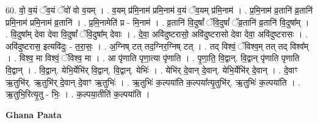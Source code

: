 \documentclass[17pt]{extarticle}
\begin{document}
60. वो॒ व॒यं ॅव॒यं ॅवो॑ वो व॒यम् । . व॒यम् प्र॑मि॒नाम॑ प्रमि॒नाम॑ व॒यं ॅव॒यम् प्र॑मि॒नाम॑ । . प्र॒मि॒नाम॑ व्र॒तानि॑ व्र॒तानि॑ प्रमि॒नाम॑ प्रमि॒नाम॑ व्र॒तानि॑ । . प्र॒मि॒नामेति॑ प्र - मि॒नाम॑ । . व्र॒तानि॑ वि॒दुषां᳚ ॅवि॒दुषां᳚ ॅव्र॒तानि॑ व्र॒तानि॑ वि॒दुषा᳚म् । . वि॒दुषा᳚म् देवा देवा वि॒दुषां᳚ ॅवि॒दुषा᳚म् देवाः । . दे॒वा॒ अवि॑दुष्टरासो॒ अवि॑दुष्टरासो देवा देवा॒ अवि॑दुष्टरासः । . अवि॑दुष्टरास॒ इत्यवि॑दुः - त॒रा॒सः॒ । . अ॒ग्निष् टत् तद॒ग्निर॒ग्निष् टत् । . तद् विश्वं॒ ॅविश्व॒म् तत् तद् विश्व᳚म् । . विश्व॒ मा विश्वं॒ ॅविश्व॒ मा । . आ पृ॑णाति पृणा॒त्या पृ॑णाति । . पृ॒णा॒ति॒ वि॒द्वान्. वि॒द्वान् पृ॑णाति पृणाति वि॒द्वान् । . वि॒द्वान्. येभि॒र्येभि॑र् वि॒द्वान्. वि॒द्वान्. येभिः॑ । . येभि॑र् दे॒वान् दे॒वान्. येभि॒र्येभि॑र् दे॒वान् । . दे॒वाꣳ ऋ॒तुभि॑र्. ऋ॒तुभि॑र् दे॒वान् दे॒वाꣳ ऋ॒तुभिः॑ । . ऋ॒तुभिः॑ क॒ल्पया॑ति क॒ल्पया᳚त्यृ॒तुभि॑र्. ऋ॒तुभिः॑ क॒ल्पया॑ति । . ऋ॒तुभि॒रित्यृ॒तु - भिः॒ । . क॒ल्पया॒तीति॑ क॒ल्पया॑ति । \newline

\textbf{Ghana Paata } \newline
\end{document}
